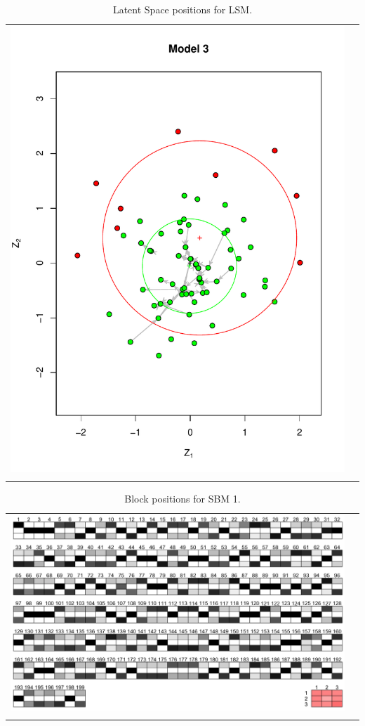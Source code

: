 \documentclass[fleqn,12pt]{wlscirep}
\begin{document}
\begin{longtable}[!h]{c@{\hskip 0cm}c}
\includegraphics[height=.75\textheight, clip=true, trim=.5cm .5cm 0cm .6cm]{figures/LSM_m3.pdf}   \\
\caption{\label{fig:LSM_plot_3} Latent Space positions for LSM.}
\end{longtable}

\begin{longtable}[!h]{c@{\hskip 0cm}c}
\includegraphics[height=.4\textheight, clip=true, trim=0cm 0cm 0cm 0cm]{figures/SBM_m1}   \\
\caption{\label{fig:SBM_plot_1} Block positions for SBM 1.}
\end{longtable}
\end{document}
